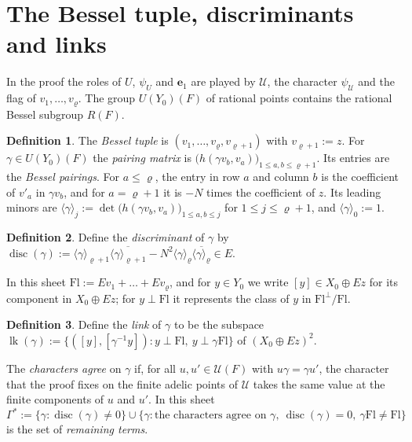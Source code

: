 \documentclass[reqno]{amsart}
\theoremstyle{definition}
\newtheorem{definition}{Definition}[section]
\theoremstyle{plain}
\theoremstyle{remark}
\newcommand{\Uc}{{\mathcal{U}}}
\newcommand{\be}{\mathbf e}
\newcommand{\disc}{\operatorname{disc}}
\newcommand{\lk}{\operatorname{lk}}
\newcommand{\Fl}{\mathrm{Fl}}
\begin{document}
\section{The Bessel tuple, discriminants and links}\label{sec:frames}

In the proof the roles of \(U\), \(\psi_U\) and \(\be_1\) are played by \(\Uc\), the character \(\psi_{\Uc}\) and the flag of \(v_1,\dots,v_\varrho\).  The group \(U(Y_0)(F)\) of rational points contains the rational Bessel subgroup \(R(F)\).

\begin{definition}\label{def:frame}
The \emph{Bessel tuple} is \((v_1,\dots,v_\varrho,v_{\varrho+1})\) with \(v_{\varrho+1}:=z\).  For \(\gamma\in U(Y_0)(F)\) the \emph{pairing matrix} is \(\bigl(h(\gamma v_b,v_a)\bigr)_{1\le a,b\le\varrho+1}\).  Its entries are the \emph{Bessel pairings}.  For \(a\le\varrho\), the entry in row \(a\) and column \(b\) is the coefficient of \(v'_a\) in \(\gamma v_b\), and for \(a=\varrho+1\) it is \(-N\) times the coefficient of \(z\).  Its leading minors are \(\langle\gamma\rangle_j:=\det\bigl(h(\gamma v_b,v_a)\bigr)_{1\le a,b\le j}\) for \(1\le j\le\varrho+1\), and \(\langle\gamma\rangle_0:=1\).
\end{definition}

\begin{definition}\label{def:disc}
Define the \emph{discriminant} of \(\gamma\) by \(\disc(\gamma):=\langle\gamma\rangle_{\varrho+1}\overline{\langle\gamma\rangle_{\varrho+1}}-N^2\langle\gamma\rangle_\varrho\overline{\langle\gamma\rangle_\varrho}\in E\).
\end{definition}

In this sheet \(\Fl:=Ev_1+\dots+Ev_\varrho\), and for \(y\in Y_0\) we write \([y]\in X_0\oplus Ez\) for its component in \(X_0\oplus Ez\); for \(y\perp\Fl\) it represents the class of \(y\) in \(\Fl^\perp/\Fl\).

\begin{definition}\label{def:link}
Define the \emph{link} of \(\gamma\) to be the subspace \(\lk(\gamma):=\{([y],[\gamma^{-1}y]):y\perp\Fl,\ y\perp\gamma\Fl\}\) of \((X_0\oplus Ez)^2\).
\end{definition}

The \emph{characters agree} on \(\gamma\) if, for all \(u,u'\in\Uc(F)\) with \(u\gamma=\gamma u'\), the character that the proof fixes on the finite adelic points of \(\Uc\) takes the same value at the finite components of \(u\) and \(u'\).  In this sheet
\[
 \Gamma^*:=\{\gamma:\disc(\gamma)\ne0\}\cup\{\gamma:\text{the characters agree on }\gamma,\ \disc(\gamma)=0,\ \gamma\Fl\ne\Fl\}
\]
is the set of \emph{remaining terms}.
\end{document}
